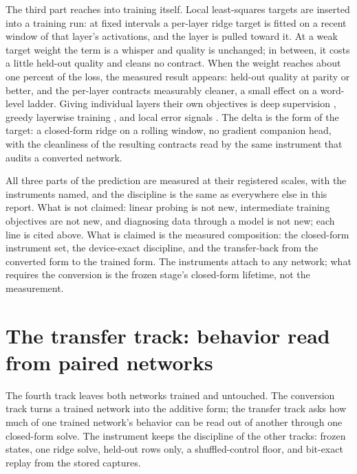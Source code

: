 \documentclass[11pt]{article}
\begin{document}
The third part reaches into training itself. Local least-squares
targets are inserted into a training run: at fixed intervals a
per-layer ridge target is fitted on a recent window of that
layer's activations, and the layer is pulled toward it. At a
weak target weight the term is a whisper and quality is
unchanged; in between, it costs a little held-out quality and
cleans no contract. When the weight reaches about one percent
of the loss, the measured result appears: held-out quality at
parity or better, and the per-layer contracts measurably
cleaner, a small effect on a word-level ladder. Giving
individual layers their
own objectives is deep supervision \cite{lee2015}, greedy
layerwise training \cite{belilovsky2019}, and local error
signals \cite{nokland2019}. The delta is the form of the
target: a closed-form ridge on a rolling window, no gradient
companion head, with the cleanliness of the resulting contracts
read by the same instrument that audits a converted network.

All three parts of the prediction are measured at their
registered scales, with the instruments named, and the
discipline is the same as everywhere else in this report. What
is not claimed: linear probing is not new, intermediate
training objectives are not new, and diagnosing data through a
model is not new; each line is cited above. What is claimed is
the measured composition: the closed-form instrument set, the
device-exact discipline, and the transfer-back from the
converted form to the trained form. The instruments attach to
any network; what requires the conversion is the frozen stage's
closed-form lifetime, not the measurement.

\section{The transfer track: behavior read from paired networks}
\label{sec:transfer}

The fourth track leaves both networks trained and untouched. The
conversion track turns a trained network into the additive form;
the transfer track asks how much of one trained network's behavior
can be read out of another through one closed-form solve. The
instrument keeps the discipline of the other tracks: frozen
states, one ridge solve, held-out rows only, a shuffled-control
floor, and bit-exact replay from the stored captures.
\end{document}

